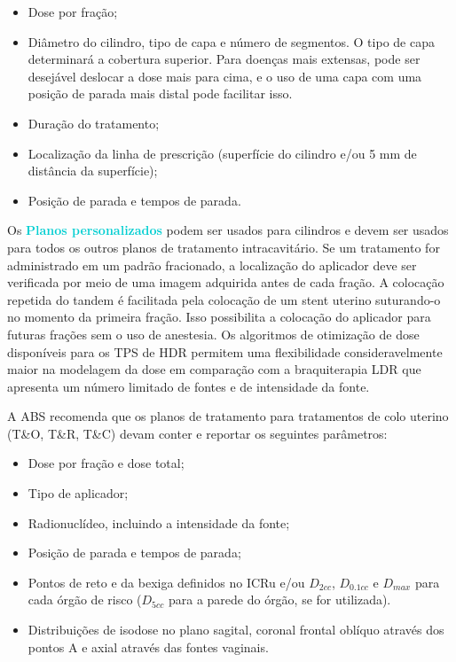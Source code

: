 \documentclass[11pt,a4paper]{article}
\begin{document}
	\begin{itemize}[label=\textcolor{CarnationPink}{$\blacktriangleright$}]
		\item Dose por fração;
		\item Diâmetro do cilindro, tipo de capa e número de segmentos. O tipo de capa determinará a cobertura superior. Para doenças mais extensas, pode ser desejável deslocar a dose mais para cima, e o uso de uma capa com uma posição de parada mais distal pode facilitar isso.
		\item Duração do tratamento;
		\item Localização da linha de prescrição (superfície do cilindro e/ou 5 mm de distância da superfície);
		\item Posição de parada e tempos de parada.
	\end{itemize}

	Os \textcolor{DarkTurquoise}{\textbf{Planos personalizados}} podem ser usados para cilindros e devem ser usados para todos os outros planos de tratamento intracavitário. Se um tratamento for administrado em um padrão fracionado, a localização do aplicador deve ser verificada por meio de uma imagem adquirida antes de cada fração. A colocação repetida do tandem é facilitada pela colocação de um stent uterino suturando-o no momento da primeira fração. Isso possibilita a colocação do aplicador para futuras frações sem o uso de anestesia. Os algoritmos de otimização de dose disponíveis para os TPS de HDR permitem uma flexibilidade consideravelmente maior na modelagem da dose em comparação com a braquiterapia LDR que apresenta um número limitado de fontes e  de intensidade da fonte.

	A ABS recomenda que os planos de tratamento para tratamentos de colo uterino (T\&O, T\&R, T\&C) devam conter e reportar os seguintes parâmetros:

	\begin{itemize}[label=\textcolor{CarnationPink}{$\blacktriangleright$}]
		\item Dose por fração e dose total;
		\item Tipo de aplicador;
		\item Radionuclídeo, incluindo a intensidade da fonte;
		\item Posição de parada e tempos de parada;
		\item Pontos de reto e da bexiga definidos no ICRu e/ou $D_{2cc}$, $D_{0.1cc}$ e $D_{max}$ para cada órgão de risco ($D_{5cc}$ para a parede do órgão, se for utilizada).
		\item Distribuições de isodose no plano sagital, coronal frontal oblíquo através dos pontos A e axial através das fontes vaginais.
	\end{itemize}
\end{document}
